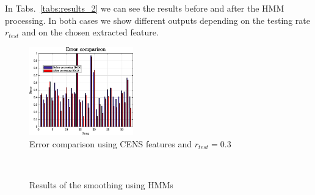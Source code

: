 In Tabs.~\ref{tabs:results_2} we can see the results before and after the HMM processing. In both cases we show different outputs depending on the testing rate $r_{test}$ and on the chosen extracted feature.
%
\begin{figure}[t]
	\centering
	\includegraphics[width=0.4\textwidth]{img/Result_HMM/CENS/plot03071}
	\vspace{-3mm}
	\caption{Error comparison using CENS features and $r_{test}=0.3$}
	\label{fig:compareerror}
	\vspace{-6mm}
\end{figure}
\begin{figure}[tb]
	\centering
	\\
	\vspace{-3mm}
	\caption{Results of the smoothing using HMMs}
	\vspace{-6mm}
\end{figure}
